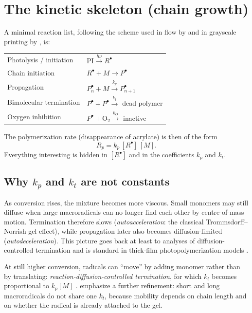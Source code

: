\section{The kinetic skeleton (chain growth)}

A minimal reaction list, following the scheme used in flow by \citet{Slutzky2019} and in grayscale printing by \citet{Montgomery2022}, is:

\begin{center}
\begin{tabular}{@{}ll@{}}
\toprule
Photolysis / initiation & $\mathrm{PI} \xrightarrow{h\nu} R^\bullet$ \\
Chain initiation        & $R^\bullet + M \rightarrow P^\bullet$ \\
Propagation             & $P^\bullet_n + M \xrightarrow{k_p} P^\bullet_{n+1}$ \\
Bimolecular termination & $P^\bullet + P^\bullet \xrightarrow{k_t}$ dead polymer \\
Oxygen inhibition       & $P^\bullet + \mathrm{O}_2 \xrightarrow{k_O}$ inactive \\
\bottomrule
\end{tabular}
\end{center}

The polymerization rate (disappearance of acrylate) is then of the form
\begin{equation}
  R_p = k_p\,[R^\bullet]\,[M].
  \label{eq:Rp}
\end{equation}
Everything interesting is hidden in $[R^\bullet]$ and in the coefficients $k_p$ and $k_t$.

\subsection{\texorpdfstring{Why $k_p$ and $k_t$ are not constants}{Why kp and kt are not constants}}

As conversion rises, the mixture becomes more viscous.
Small monomers may still diffuse when large macroradicals can no longer find each other by centre-of-mass motion.
Termination therefore slows (\emph{autoacceleration}: the classical Trommsdorff--Norrish gel effect), while propagation later also becomes diffusion-limited (\emph{autodeceleration}).
This picture goes back at least to analyses of diffusion-controlled termination \citep{Benson1959} and is standard in thick-film photopolymerization models \citep{Goodner2002,Anseth1994}.

At still higher conversion, radicals can ``move'' by adding monomer rather than by translating: \emph{reaction-diffusion-controlled termination}, for which $k_t$ becomes proportional to $k_p[M]$ \citep{Anseth1994,Dobson2024,Montgomery2022}.
\citet{Dobson2024} emphasize a further refinement: short and long macroradicals do not share one $k_t$, because mobility depends on chain length and on whether the radical is already attached to the gel.

